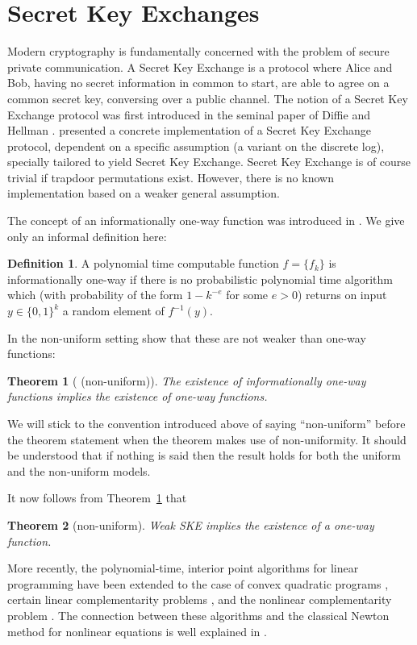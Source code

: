 \documentclass{article}
\newtheorem{thm}{Theorem}[section]
\theoremstyle{definition}
\newtheorem{defn}{Definition}[section]
\theoremstyle{remark}
\newcommand{\thmref}[1]{Theorem~\ref{#1}}
\begin{document}
\section{Secret Key Exchanges}
\label{SKE}

Modern cryptography is fundamentally concerned with the problem of
secure private communication.  A Secret Key Exchange is a protocol
where Alice and Bob, having no secret information in common to start,
are able to agree on a common secret key, conversing over a public
channel.  The notion of a Secret Key Exchange protocol was first
introduced in the seminal paper of Diffie and Hellman
\cite{dihe:newdir}. \cite{dihe:newdir} presented a concrete
implementation of a Secret Key Exchange protocol, dependent on a
specific assumption (a variant on the discrete log), specially
tailored to yield Secret Key Exchange. Secret Key Exchange is of
course trivial if trapdoor permutations exist. However, there is no
known implementation based on a weaker general assumption.

The concept of an informationally one-way function was introduced
in \cite{imlelu:oneway}. We give only an informal definition here:

\begin{defn} A polynomial time
computable function $f = \{f_k\}$ is informationally
one-way if there is no probabilistic polynomial time algorithm which
(with probability of the form $1 - k^{-e}$ for some $e > 0$)
returns on input $y \in \{0,1\}^{k}$ a random element of $f^{-1}(y)$.
\end{defn}
In the non-uniform setting \cite{imlelu:oneway} show that these are not
weaker than one-way functions:
\begin{thm}[\cite{imlelu:oneway} (non-uniform)]
\label{th-info-ow-ow}
The existence of informationally one-way functions
implies the existence of one-way functions.
\end{thm}
We will stick to the convention introduced above of saying
``non-uniform'' before the theorem statement when the theorem
makes use of non-uniformity. It should be understood that
if nothing is said then the result holds for both the uniform and
the non-uniform models.

It now follows from \thmref{th-info-ow-ow} that

\begin{thm}[non-uniform]\label{th-weak-ske-owf} Weak SKE
implies the existence of a one-way function.
\end{thm}

More recently, the polynomial-time, interior point algorithms for linear
programming have been extended to the case of convex quadratic programs
\cite{moad:quadpro,ye:intalg}, certain linear complementarity problems
\cite{komiyo:lincomp,miyoki:lincomp}, and the nonlinear complementarity
problem \cite{komiyo:unipfunc}. The connection between these algorithms
and the classical Newton method for nonlinear equations is well
explained in \cite{komiyo:lincomp}.
\end{document}
